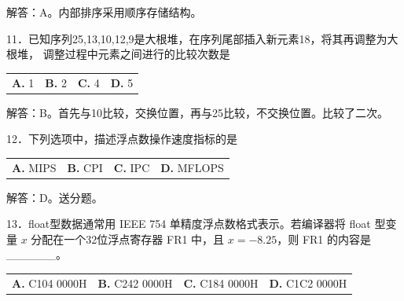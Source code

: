 \documentclass[UTF8,11pt]{ctexart}
\begin{document}
解答：A。内部排序采用顺序存储结构。


11．已知序列25,13,10,12,9是大根堆，在序列尾部插入新元素18，将其再调整为大根堆， 调整过程中元素之间进行的比较次数是


\begin{center}\begin{tabular}{>{\raggedright\arraybackslash}p{\dimexpr(\linewidth-8\tabcolsep)/4\relax}>{\raggedright\arraybackslash}p{\dimexpr(\linewidth-8\tabcolsep)/4\relax}>{\raggedright\arraybackslash}p{\dimexpr(\linewidth-8\tabcolsep)/4\relax}>{\raggedright\arraybackslash}p{\dimexpr(\linewidth-8\tabcolsep)/4\relax}}
\textbf{A.} 1 & \textbf{B.} 2 & \textbf{C.} 4 & \textbf{D.} 5\\[.35em]\end{tabular}\end{center}

解答：B。首先与10比较，交换位置，再与25比较，不交换位置。比较了二次。


12．下列选项中，描述浮点数操作速度指标的是


\begin{center}\begin{tabular}{>{\raggedright\arraybackslash}p{\dimexpr(\linewidth-8\tabcolsep)/4\relax}>{\raggedright\arraybackslash}p{\dimexpr(\linewidth-8\tabcolsep)/4\relax}>{\raggedright\arraybackslash}p{\dimexpr(\linewidth-8\tabcolsep)/4\relax}>{\raggedright\arraybackslash}p{\dimexpr(\linewidth-8\tabcolsep)/4\relax}}
\textbf{A.} MIPS & \textbf{B.} CPI & \textbf{C.} IPC & \textbf{D.} MFLOPS\\[.35em]\end{tabular}\end{center}

解答：D。送分题。


13．float型数据通常用 IEEE 754 单精度浮点数格式表示。若编译器将 float 型变量 \(\displaystyle x\) 分配在一个32位浮点寄存器 FR1 中，且 \(\displaystyle x=-8.25\)，则 FR1 的内容是\_\_\_\_\_\_。


\begin{center}\begin{tabular}{>{\raggedright\arraybackslash}p{\dimexpr(\linewidth-8\tabcolsep)/4\relax}>{\raggedright\arraybackslash}p{\dimexpr(\linewidth-8\tabcolsep)/4\relax}>{\raggedright\arraybackslash}p{\dimexpr(\linewidth-8\tabcolsep)/4\relax}>{\raggedright\arraybackslash}p{\dimexpr(\linewidth-8\tabcolsep)/4\relax}}
\textbf{A.} C104 0000H & \textbf{B.} C242 0000H & \textbf{C.} C184 0000H & \textbf{D.} C1C2 0000H\\[.35em]\end{tabular}\end{center}
\end{document}
